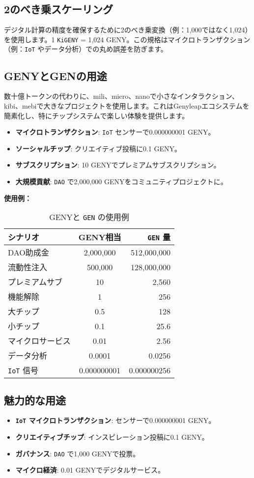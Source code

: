 \documentclass[a4paper,12pt,openany]{book}
\begin{document}
\subsection*{2のべき乗スケーリング}
デジタル計算の精度を確保するために2のべき乗変換（例：1,000ではなく1,024）を使用します。1 \texttt{KiGENY} = 1,024 GENY。この規格はマイクロトランザクション（例：\texttt{IoT} やデータ分析）での丸め誤差を防ぎます。

\subsection*{GENYとGENの用途}
数十億トークンの代わりに、mili、micro、nanoで小さなインタラクション、kibi、mebiで大きなプロジェクトを使用します。これはGenyleapエコシステムを簡素化し、特にチップシステムで楽しい体験を提供します。
\begin{itemize}
    \item \textbf{マイクロトランザクション}: \texttt{IoT} センサーで0.000000001 GENY。
    \item \textbf{ソーシャルチップ}: クリエイティブ投稿に0.1 GENY。
    \item \textbf{サブスクリプション}: 10 GENYでプレミアムサブスクリプション。
    \item \textbf{大規模貢献}: \texttt{DAO} で2,000,000 GENYをコミュニティプロジェクトに。
\end{itemize}

\textbf{使用例：}
\begin{table}[h]
\centering
\caption{GENYと \texttt{GEN} の使用例}
\small
\begin{tabular}{l c r}
\hline
\textbf{シナリオ} & \textbf{GENY相当} & \textbf{\texttt{GEN} 量} \\
\hline
DAO助成金 & 2,000,000 & 512,000,000 \\
流動性注入 & 500,000 & 128,000,000 \\
プレミアムサブ & 10 & 2,560 \\
機能解除 & 1 & 256 \\
大チップ & 0.5 & 128 \\
小チップ & 0.1 & 25.6 \\
マイクロサービス & 0.01 & 2.56 \\
データ分析 & 0.0001 & 0.0256 \\
\texttt{IoT} 信号 & 0.000000001 & 0.000000256 \\
\hline
\end{tabular}
\end{table}

\subsection*{魅力的な用途}
\begin{itemize}
    \item \textbf{\texttt{IoT} マイクロトランザクション}: センサーで0.000000001 GENY。
    \item \textbf{クリエイティブチップ}: インスピレーション投稿に0.1 GENY。
    \item \textbf{ガバナンス}: \texttt{DAO} で1,000 GENYで投票。
    \item \textbf{マイクロ経済}: 0.01 GENYでデジタルサービス。
\end{itemize}
\end{document}
